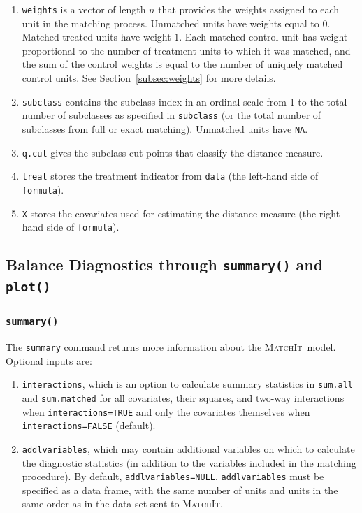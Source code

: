 \documentclass[oneside,letterpaper,titlepage]{article}
\newcommand{\MatchIt}{\textsc{MatchIt}}
\begin{document}
\begin{enumerate}
\item \texttt{weights} is a vector of length $n$ that provides the
  weights assigned to each unit in the matching process.  Unmatched
  units have weights equal to $0$. Matched treated units have weight
  $1$.  Each matched control unit has weight proportional to the
  number of treatment units to which it was matched, and the sum of
  the control weights is equal to the number of uniquely matched
  control units. See Section~\ref{subsec:weights} for more details.
  
\item \texttt{subclass} contains the subclass index in an ordinal
  scale from 1 to the total number of subclasses as specified in
  \texttt{subclass} (or the total number of subclasses from full or
  exact matching).  Unmatched units have \texttt{NA}.
  
\item \texttt{q.cut} gives the subclass cut-points that classify the
  distance measure.
  
\item \texttt{treat} stores the treatment indicator from
  \texttt{data} (the left-hand side of \texttt{formula}).
 
\item \texttt{X} stores the covariates used for estimating the
  distance measure (the right-hand side of \texttt{formula}).
\end{enumerate}


\subsection{Balance Diagnostics through {\tt summary()} and {\tt plot()}}
\label{cmd:sum}

\subsubsection{{\tt summary()}}
The \texttt{summary} command returns more information about the
\MatchIt\ model.  Optional inputs are:

\begin{enumerate}
\item \texttt{interactions}, which is an option to calculate summary
  statistics in \texttt{sum.all} and \texttt{sum.matched} for all
  covariates, their squares, and two-way interactions when
  \texttt{interactions=TRUE} and only the covariates themselves when
  \texttt{interactions=FALSE} (default).
\item \texttt{addlvariables}, which may contain additional variables
  on which to calculate the diagnostic statistics (in addition to the
  variables included in the matching procedure).  By default,
  \texttt{addlvariables=NULL}.  \texttt{addlvariables} must be
  specified as a data frame, with the same number of units and units in
  the same order as in the data set sent to \MatchIt .
\end{enumerate}
\end{document}

